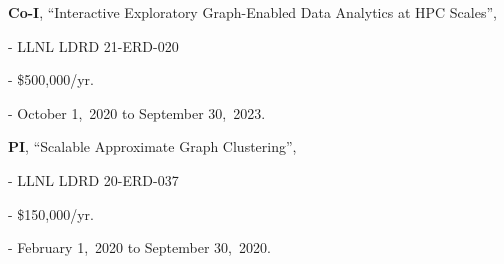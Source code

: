 \begin{innerlist}
  \item[] \textbf{Co-I},
  ``Interactive Exploratory Graph-Enabled Data Analytics at HPC Scales'',
  \begin{innerlist}
    \item[-] LLNL LDRD 21-ERD-020
    \item[-] \$500,000/yr.
    \item[-] October 1,~2020 to September 30,~2023.
  \end{innerlist}

  \item[] \textbf{PI},
  ``Scalable Approximate Graph Clustering'',
  \begin{innerlist}
    \item[-] LLNL LDRD 20-ERD-037
    \item[-] \$150,000/yr.
    \item[-] February 1,~2020 to September 30,~2020.
  \end{innerlist}

\end{innerlist}
